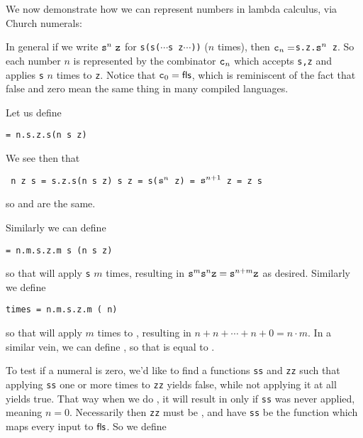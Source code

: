 We now demonstrate how we can represent numbers in lambda calculus, via Church numerals:

\medskip
\centerline{\vbox{}}
\medskip

In general if we write ${\tt s}^n\ \tt z$ for {\tt s(s($\cdots$s z$\cdots$))} ($n$ times), then $\cn n=${\tt\lambda s.\lambda z.${\tt s}^n$ z}.
So each number $n$ is represented by the combinator $\cn n$ which accepts {\tt s,z} and applies {\tt s} $n$ times to {\tt z}.
Notice that $\cn0=\fls$, which is reminiscent of the fact that false and zero mean the same thing in many compiled languages.

Let us define

\centerline{\tt \scc = \lambda n.\lambda s.\lambda z.s(n s z)}

We see then that

\centerline{\tt\scc\ \cn n z s = \lambda s.\lambda z.s(\cn n s z) s z = s(${\tt s}^n$ z) = ${\tt s}^{n+1}$ z =  z s}
so  and  are the same.

Similarly we can define

\centerline{\tt \plus = \lambda n.\lambda m.\lambda s.\lambda z.m s (n s z)}

so that  will apply {\tt s}  $m$ times, resulting in ${\tt s}^m{\tt s}^n{\tt z}={\tt s}^{n+m}{\tt z}$ as desired.
Similarly we define

\smallskip
\centerline{\tt times = \lambda n.\lambda m.\lambda s.\lambda z.m (\plus\ n) }

so that  will apply  $m$ times to , resulting in $n+n+\cdots+n+0=n\cdot m$.
In a similar vein, we can define , so that  is equal to .

To test if a numeral is zero, we'd like to find a functions {\tt ss} and {\tt zz} such that applying {\tt ss} one or more times to {\tt zz} yields false, while not applying it at all yields true.
That way when we do , it will result in \tru{} only if {\tt ss} was never applied, meaning $n=0$.
Necessarily then {\tt zz} must be \tru, and have {\tt ss} be the function which maps every input to ${\sf fls}$.
So we define


